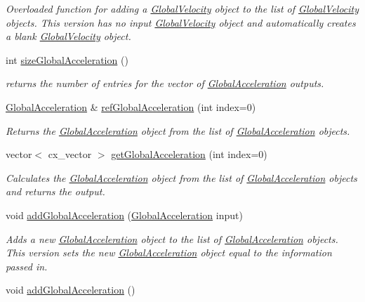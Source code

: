 \begin{DoxyCompactItemize}
\begin{DoxyCompactList}\small\item\em Overloaded function for adding a \hyperlink{class_global_velocity}{Global\-Velocity} object to the list of \hyperlink{class_global_velocity}{Global\-Velocity} objects. This version has no input \hyperlink{class_global_velocity}{Global\-Velocity} object and automatically creates a blank \hyperlink{class_global_velocity}{Global\-Velocity} object. \end{DoxyCompactList}\item 
int \hyperlink{class_outputs_body_a4265e0ece0f65f6ee6b3e36fc66bf960}{size\-Global\-Acceleration} ()
\begin{DoxyCompactList}\small\item\em returns the number of entries for the vector of \hyperlink{class_global_acceleration}{Global\-Acceleration} outputs. \end{DoxyCompactList}\item 
\hyperlink{class_global_acceleration}{Global\-Acceleration} \& \hyperlink{class_outputs_body_a7be24ef361c2dcd9c6b9c62d58ee34bd}{ref\-Global\-Acceleration} (int index=0)
\begin{DoxyCompactList}\small\item\em Returns the \hyperlink{class_global_acceleration}{Global\-Acceleration} object from the list of \hyperlink{class_global_acceleration}{Global\-Acceleration} objects. \end{DoxyCompactList}\item 
vector$<$ cx\-\_\-vector $>$ \hyperlink{class_outputs_body_a9c4de0023e30be8e03c4f910a3848bdc}{get\-Global\-Acceleration} (int index=0)
\begin{DoxyCompactList}\small\item\em Calculates the \hyperlink{class_global_acceleration}{Global\-Acceleration} object from the list of \hyperlink{class_global_acceleration}{Global\-Acceleration} objects and returns the output. \end{DoxyCompactList}\item 
void \hyperlink{class_outputs_body_a38f7909d116feefc04acc11f58515c8c}{add\-Global\-Acceleration} (\hyperlink{class_global_acceleration}{Global\-Acceleration} input)
\begin{DoxyCompactList}\small\item\em Adds a new \hyperlink{class_global_acceleration}{Global\-Acceleration} object to the list of \hyperlink{class_global_acceleration}{Global\-Acceleration} objects. This version sets the new \hyperlink{class_global_acceleration}{Global\-Acceleration} object equal to the information passed in. \end{DoxyCompactList}\item 
\hypertarget{class_outputs_body_a3205155873f5db270a71377e5ff80bb4}{void \hyperlink{class_outputs_body_a3205155873f5db270a71377e5ff80bb4}{add\-Global\-Acceleration} ()}\label{class_outputs_body_a3205155873f5db270a71377e5ff80bb4}


\end{DoxyCompactItemize}
